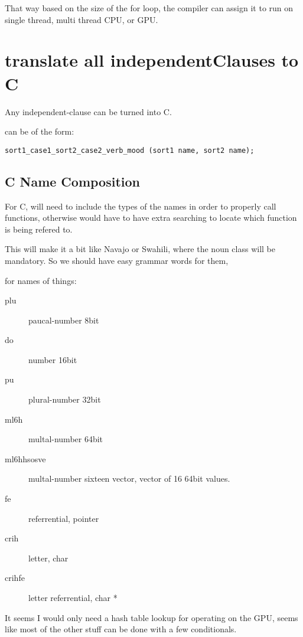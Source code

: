 That way based on the size of the for loop, the compiler can assign it to run on
single thread, multi thread CPU, or GPU.\@ 

\section{translate all independentClauses to C}

Any independent-clause can be turned into C.

can be of the form:
\begin{lstlisting}
sort1_case1_sort2_case2_verb_mood (sort1 name, sort2 name); 
\end{lstlisting}

\subsection{C Name Composition}

For C, will need to include the types of the names in order to properly  call
functions, otherwise would have to have extra searching to locate which
function is being refered to. 

This will make it a bit like Navajo or Swahili, where the noun class will be
mandatory. So we should have easy grammar words for them,

for names of things:
\begin{description}
  \item[plu] paucal-number 8bit 
  \item[do]  number 16bit
  \item[pu] plural-number 32bit
  \item[ml6h] multal-number 64bit
  \item[ml6hhsosve] multal-number sixteen vector, vector of 16 64bit values.
  \item[fe] referrential, pointer
  \item[crih] letter, char
  \item[crihfe] letter referrential, char *
\end{description}

It seems I would only need a hash table lookup for operating on the GPU,
seems like most of the other stuff can be done with a few conditionals. 

